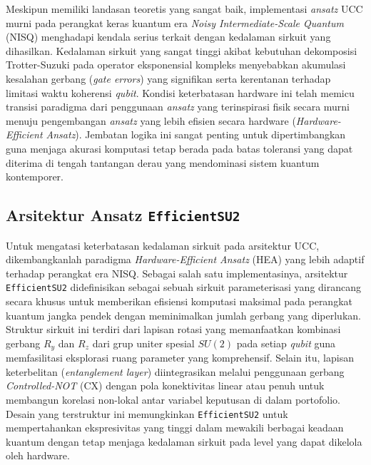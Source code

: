 Meskipun memiliki landasan teoretis yang sangat baik, implementasi \textit{ansatz} UCC murni pada perangkat keras kuantum era \textit{Noisy Intermediate-Scale Quantum} (NISQ) menghadapi kendala serius terkait dengan kedalaman sirkuit yang dihasilkan. Kedalaman sirkuit yang sangat tinggi akibat kebutuhan dekomposisi Trotter-Suzuki pada operator eksponensial kompleks menyebabkan akumulasi kesalahan gerbang (\textit{gate errors}) yang signifikan serta kerentanan terhadap limitasi waktu koherensi \textit{qubit}. Kondisi keterbatasan hardware ini telah memicu transisi paradigma dari penggunaan \textit{ansatz} yang terinspirasi fisik secara murni menuju pengembangan \textit{ansatz} yang lebih efisien secara hardware (\textit{Hardware-Efficient Ansatz}). Jembatan logika ini sangat penting untuk dipertimbangkan guna menjaga akurasi komputasi tetap berada pada batas toleransi yang dapat diterima di tengah tantangan derau yang mendominasi sistem kuantum kontemporer.

\subsection{Arsitektur Ansatz \texttt{EfficientSU2}}
Untuk mengatasi keterbatasan kedalaman sirkuit pada arsitektur UCC, dikembangkanlah paradigma \textit{Hardware-Efficient Ansatz} (HEA) yang lebih adaptif terhadap perangkat era NISQ. Sebagai salah satu implementasinya, arsitektur \texttt{EfficientSU2} didefinisikan sebagai sebuah sirkuit parameterisasi yang dirancang secara khusus untuk memberikan efisiensi komputasi maksimal pada perangkat kuantum jangka pendek dengan meminimalkan jumlah gerbang yang diperlukan. Struktur sirkuit ini terdiri dari lapisan rotasi yang memanfaatkan kombinasi gerbang $R_y$ dan $R_z$ dari grup uniter spesial $SU(2)$ pada setiap \textit{qubit} guna memfasilitasi eksplorasi ruang parameter yang komprehensif. Selain itu, lapisan keterbelitan (\textit{entanglement layer}) diintegrasikan melalui penggunaan gerbang \textit{Controlled-NOT} (CX) dengan pola konektivitas linear atau penuh untuk membangun korelasi non-lokal antar variabel keputusan di dalam portofolio. Desain yang terstruktur ini memungkinkan \texttt{EfficientSU2} untuk mempertahankan ekspresivitas yang tinggi dalam mewakili berbagai keadaan kuantum dengan tetap menjaga kedalaman sirkuit pada level yang dapat dikelola oleh hardware.

